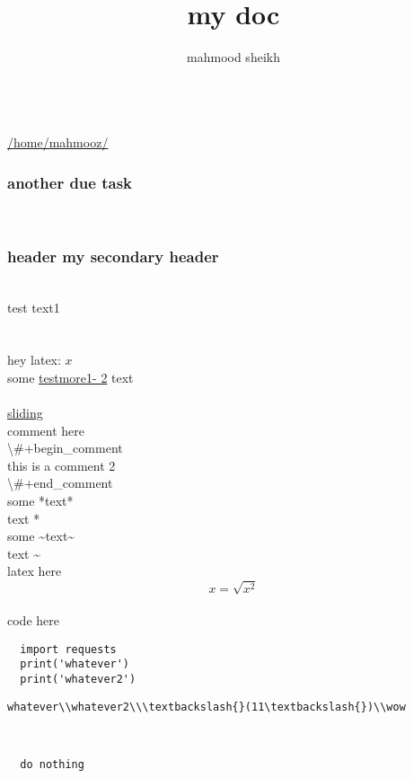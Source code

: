\documentclass[11pt]{article}
\author{mahmood sheikh}
\title{my doc}
\begin{document}
\\\href{/home/mahmooz/}{/home/mahmooz/}\\\subsubsection{another due task}\\\subsubsection{header my secondary header}\\test text1\\\\\\hey latex: \(x\)\\some \href{here1}{testmore1- 2} text\\\href{sliding.gif}{}\\\href{sliding}{sliding}\\comment here\\\textbackslash{}\#+begin\_comment\\this is a comment 2\\\textbackslash{}\#+end\_comment\\some *text*\\text *\\some \textasciitilde{}text\textasciitilde{}\\text \textasciitilde{}\\latex here\\\[ x = \sqrt{x^2} \]\\code here\\\begin{lstlisting}  import requests
  print('whatever')
  print('whatever2')
\end{lstlisting}

\begin{lstlisting}whatever\\whatever2\\\textbackslash{}(11\textbackslash{})\\wow\end{lstlisting}\\\begin{lstlisting}  do nothing
\end{lstlisting}
\end{document}

